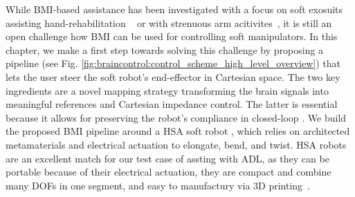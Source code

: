 While \gls{BMI}-based assistance has been investigated with a focus on 
soft exosuits assisting hand-rehabilitation ~\cite{zhang2019eeg} or with strenuous arm acitivites~\cite{tacca2022neuro}, 
it is still an open challenge how \gls{BMI} can be used for controlling soft manipulators. 
In this chapter, we make a first step towards solving this challenge by proposing a pipeline (see Fig. \ref{fig:braincontrol:control_scheme_high_level_overview}) that lets the user steer the soft robot's end-effector in Cartesian space. The two key ingredients are a novel mapping strategy transforming the brain signals into meaningful references and Cartesian impedance control. The latter is essential because it allows for preserving the robot's compliance in closed-loop \cite{della2017controlling}. We build the proposed \gls{BMI} pipeline around a \gls{HSA} soft robot \cite{stolzle2023modelling, stolzle2024experimental}, %
which relies on architected metamaterials and electrical actuation to elongate, bend, and twist.
\gls{HSA} robots are an excellent match for our test case of assting with \gls{ADL}, as they can be portable because of their electrical actuation, they are compact and combine many \glspl{DOF} in one segment, and easy to manufactury via 3D printing~\cite{truby2021recipe}.

